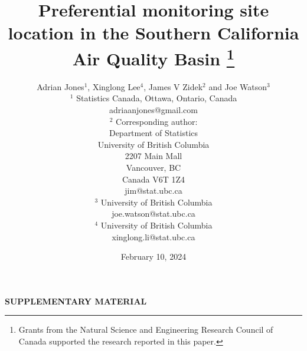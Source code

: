 \documentclass{article}
\begin{document}
	
	\title{Preferential monitoring site location in the Southern California Air Quality Basin
		\thanks{
			Grants from the Natural Science and Engineering Research Council of Canada supported the research reported in this paper.} 
	}
	
	\date{February 10, 2024}
	
	\author{Adrian Jones$^1$, Xinglong Lee$^4$, James V Zidek$^2$ and Joe Watson$^3$\\
		\small
		$^1$ Statistics Canada, Ottawa, Ontario, Canada \\\small
		adriaanjones@gmail.com\\\small
		$^2$ Corresponding author:\\\small
		Department of Statistics\\\small
		University of British Columbia \\\small
		2207 Main Mall\\\small
		Vancouver, BC \\\small
		Canada V6T 1Z4\\\small
		jim@stat.ubc.ca \\\small
		$^3$ University of British Columbia \\\small
		joe.watson@stat.ubc.ca \\\small
		$^4$ University of British Columbia \\\small
		xinglong.li@stat.ubc.ca \\\small
	}
	
	\maketitle
	\tableofcontents
	
	
	
	
	
	
	
	
	

    \begin{center}
	    {\large\bf SUPPLEMENTARY MATERIAL}
    \end{center}
    



\end{document}
